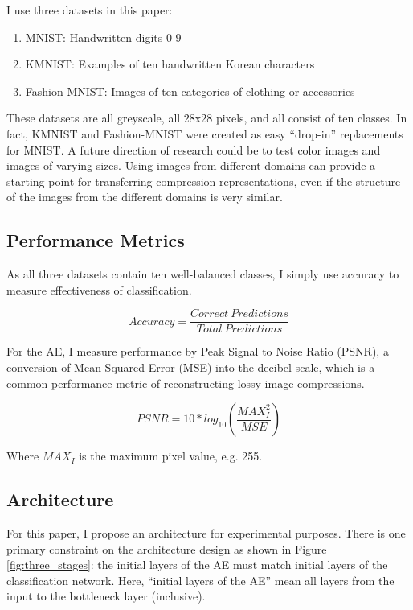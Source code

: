 \documentclass[twoside,11pt]{article}
\begin{document}
I use three datasets in this paper:

\begin{enumerate}
\item{MNIST: Handwritten digits 0-9}
\item{KMNIST: Examples of ten handwritten Korean characters}
\item{Fashion-MNIST: Images of ten categories of clothing or accessories}
\end{enumerate}

These datasets are all greyscale, all 28x28 pixels, and all consist of ten classes.
In fact, KMNIST and Fashion-MNIST were created as easy ``drop-in'' replacements for MNIST.
A future direction of research could be to test color images and images of varying sizes.
Using images from different domains can provide a starting point for transferring 
compression representations, even if the structure of the images from the different 
domains is very similar.

\subsection{Performance Metrics}

As all three datasets contain ten well-balanced classes, I simply use accuracy to measure
effectiveness of classification. 

\begin{equation}
Accuracy = \frac{Correct\ Predictions}{Total\ Predictions}
\end{equation}

For the AE, I measure performance by Peak Signal to Noise Ratio (PSNR), 
a conversion of Mean Squared Error (MSE) into the decibel scale, which is a common
performance metric of reconstructing lossy image compressions.

\begin{equation}
PSNR = 10*log_{10}\left(\frac{MAX^2_I}{MSE}\right)
\end{equation}

Where $MAX_I$ is the maximum pixel value, e.g. 255.


\subsection{Architecture}

For this paper, I propose an architecture for experimental purposes.
There is one primary constraint on the architecture design as shown in Figure \ref{fig:three_stages}:
the initial layers of the AE must match initial layers of the classification network.
Here, ``initial layers of the AE'' mean all layers from the input to the bottleneck layer (inclusive).
\end{document}
